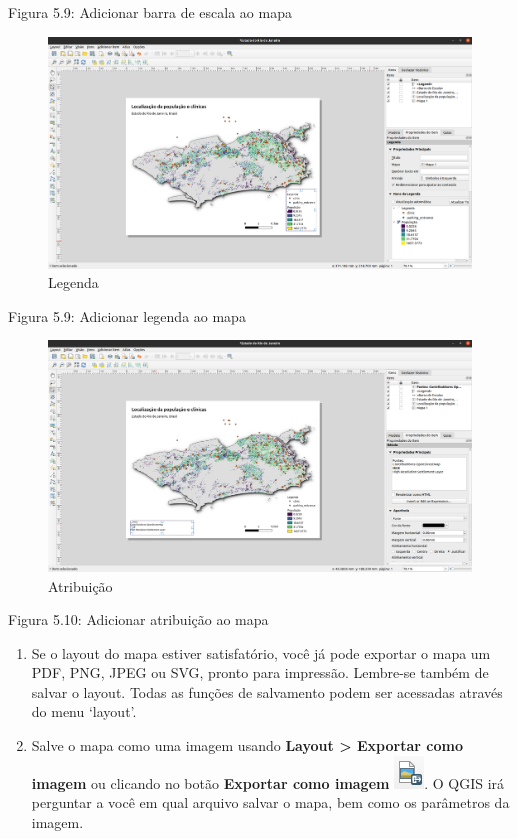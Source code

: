 \documentclass[
  portuguese,
]{krantz}
\begin{document}
Figura 5.9: Adicionar barra de escala ao mapa

\begin{figure}
\centering
\includegraphics{media/modulo5/legend.png}
\caption{Legenda}
\end{figure}

Figura 5.9: Adicionar legenda ao mapa

\begin{figure}
\centering
\includegraphics{media/modulo5/attribution.png}
\caption{Atribuição}
\end{figure}

Figura 5.10: Adicionar atribuição ao mapa

\begin{enumerate}
\def\labelenumi{\arabic{enumi}.}
\setcounter{enumi}{2}
\item
  Se o layout do mapa estiver satisfatório, você já pode exportar o mapa um PDF, PNG, JPEG ou SVG, pronto para impressão. Lembre-se também de salvar o layout. Todas as funções de salvamento podem ser acessadas através do menu `layout'.
\item
  Salve o mapa como uma imagem usando \textbf{Layout \textgreater{} Exportar como imagem} ou clicando no botão \textbf{Exportar como imagem} \includegraphics{media/modulo5/export-image-btn.png}. O QGIS irá perguntar a você em qual arquivo salvar o mapa, bem como os parâmetros da imagem.
\end{enumerate}
\end{document}
